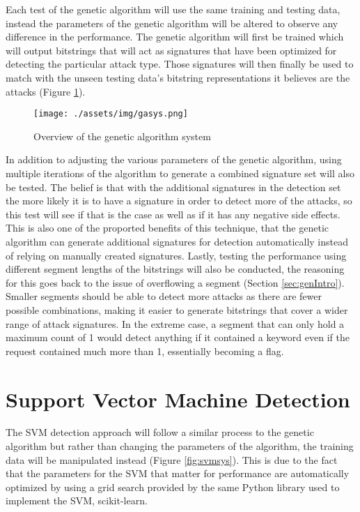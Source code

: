 Each test of the genetic algorithm will use the same training and testing data, instead the parameters of the genetic algorithm will be altered to observe any difference in the performance.  The genetic algorithm will first be trained which will output bitstrings that will act as signatures that have been optimized for detecting the particular attack type. Those signatures will then finally be used to match with the unseen testing data's bitstring representations it believes are the attacks (Figure \ref{fig:gasys}).

\begin{figure}
	\texttt{[image: ./assets/img/gasys.png]}
	\caption{Overview of the genetic algorithm system}
	\label{fig:gasys}
\end{figure}

In addition to adjusting the various parameters of the genetic algorithm, using multiple iterations of the algorithm to generate a combined signature set will also be tested.  The belief is that with the additional signatures in the detection set the more likely it is to have a signature in order to detect more of the attacks, so this test will see if that is the case as well as if it has any negative side effects.  This is also one of the proported benefits of this technique, that the genetic algorithm can generate additional signatures for detection automatically instead of relying on manually created signatures.  Lastly, testing the performance using different segment lengths of the bitstrings will also be conducted, the reasoning for this goes back to the issue of overflowing a segment (Section \ref{sec:genIntro}).  Smaller segments should be able to detect more attacks as there are fewer possible combinations, making it easier to generate bitstrings that cover a wider range of attack signatures.  In the extreme case, a segment that can only hold a maximum count of 1 would detect anything if it contained a keyword even if the request contained much more than 1, essentially becoming a flag.

\section{Support Vector Machine Detection}

The SVM detection approach will follow a similar process to the genetic algorithm but rather than changing the parameters of the algorithm, the training data will be manipulated instead (Figure \ref{fig:svmsys}).  This is due to the fact that the parameters for the SVM that matter for performance are automatically optimized by using a grid search provided by the same Python library used to implement the SVM, scikit-learn.\cite{scikit-learn}

